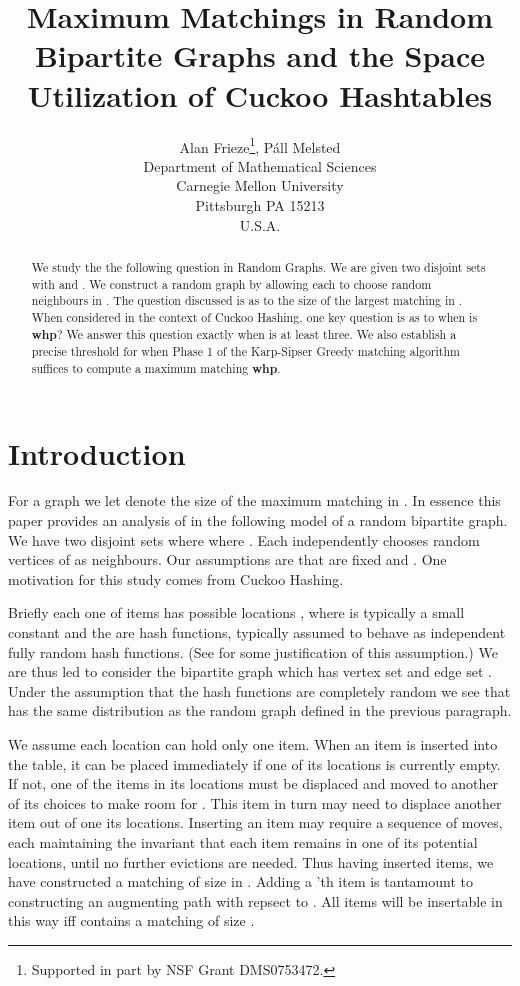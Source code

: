 \documentclass[11pt]{article}
\author{Alan Frieze\thanks{Supported in part by NSF Grant DMS0753472.}, P\'all Melsted\\
Department of Mathematical Sciences\\Carnegie Mellon University\\Pittsburgh PA 15213\\
U.S.A.}
\title{Maximum Matchings in Random Bipartite Graphs and the Space Utilization of Cuckoo Hashtables}
\date{}
\def\whp{{\bf whp}}
\begin{document}
\maketitle

\begin{abstract}
We study the the following question in Random Graphs. 
We are given two disjoint sets  with  and . We construct a random graph  by allowing each
 to choose  random neighbours in . The question discussed is as to the size  of the largest matching in .
When considered in the context of Cuckoo Hashing, one key question is as to when is  \whp? 
We answer this question exactly when 
is at least three. We also establish a precise threshold for when Phase 1 of the Karp-Sipser Greedy matching algorithm
suffices to compute a maximum matching \whp.
\end{abstract}


\section{Introduction}
For a graph  we let  denote the size of the maximum matching in .
In essence this paper provides an analysis of  
in the following model of a random bipartite graph. We have two disjoint
sets  where  where . Each  independently chooses  random vertices of  as neighbours. 
Our assumptions are that  are fixed and . One motivation for this study comes from
Cuckoo Hashing.

Briefly each one of  items  has
 possible locations , where  is
typically a small constant and the  are hash functions, typically
assumed to behave as independent fully random hash functions.  (See
\cite{MVad} for some justification of this assumption.)  
We are thus led to consider the bipartite graph  which has vertex set  and edge set . 
Under the assumption that the hash functions are completely random we see that  has the 
same distribution as the random graph defined in the previous paragraph. 

We assume
each location can hold only one item.  When an item  is inserted
into the table, it can be placed immediately if one of its  locations is
currently empty.  If not, one of the items in its  locations must
be displaced and moved to another of its  choices to make room
for .  This item in turn may need to displace another item out of one
its  locations.  Inserting an item may require a sequence of moves,
each maintaining the invariant that each item remains in one of its
 potential locations, until no further evictions are needed. 
Thus having inserted  items, we have constructed a matching  of size  in . Adding a 'th
item is tantamount to constructing an augmenting path with repsect to .
All  items will be insertable
in this way iff  contains a matching of size .
\end{document}
